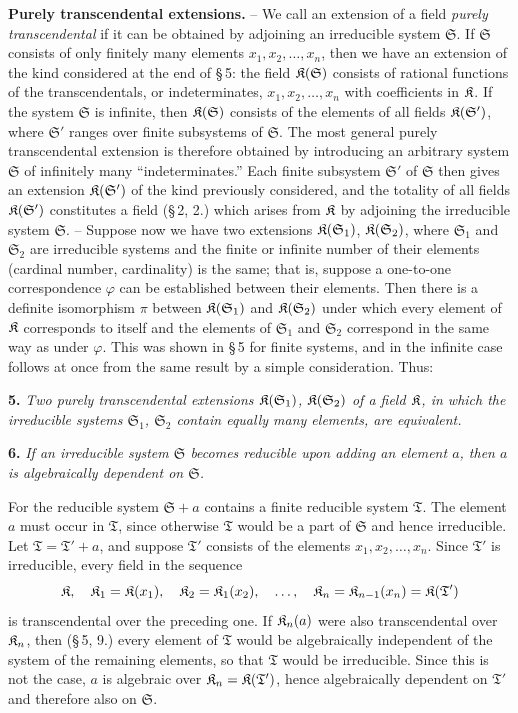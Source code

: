 \textbf{Purely transcendental extensions.} -- We call an extension of a field \emph{purely transcendental} if it can be obtained by adjoining an irreducible system $\mathfrak S$. If $\mathfrak S$ consists of only finitely many elements $x_1,x_2,\ldots,x_n$, then we have an extension of the kind considered at the end of \S\,5: the field $\mathfrak K(\mathfrak S)$ consists of rational functions of the transcendentals, or indeterminates, $x_1,x_2,\ldots,x_n$ with coefficients in $\mathfrak K$. If the system $\mathfrak S$ is infinite, then $\mathfrak K(\mathfrak S)$ consists of the elements of all fields $\mathfrak K(\mathfrak S')$, where $\mathfrak S'$ ranges over finite subsystems of $\mathfrak S$. The most general purely transcendental extension is therefore obtained by introducing an arbitrary system $\mathfrak S$ of infinitely many ``indeterminates.'' Each finite subsystem $\mathfrak S'$ of $\mathfrak S$ then gives an extension $\mathfrak K(\mathfrak S')$ of the kind previously considered, and the totality of all fields $\mathfrak K(\mathfrak S')$ constitutes a field (\S\,2, 2.) which arises from $\mathfrak K$ by adjoining the irreducible system $\mathfrak S$. -- Suppose now we have two extensions $\mathfrak K(\mathfrak S_1)$, $\mathfrak K(\mathfrak S_2)$, where $\mathfrak S_1$ and $\mathfrak S_2$ are irreducible systems and the finite or infinite number of their elements (cardinal number, cardinality) is the same; that is, suppose a one-to-one correspondence $\varphi$ can be established between their elements. Then there is a definite isomorphism $\pi$ between $\mathfrak K(\mathfrak S_1)$ and $\mathfrak K(\mathfrak S_2)$ under which every element of $\mathfrak K$ corresponds to itself and the elements of $\mathfrak S_1$ and $\mathfrak S_2$ correspond in the same way as under $\varphi$. This was shown in \S\,5 for finite systems, and in the infinite case follows at once from the same result by a simple consideration. Thus:

\textbf{5.} \emph{Two purely transcendental extensions $\mathfrak K(\mathfrak S_1)$, $\mathfrak K(\mathfrak S_2)$ of a field $\mathfrak K$, in which the irreducible systems $\mathfrak S_1$, $\mathfrak S_2$ contain equally many elements, are equivalent.}

\textbf{6.} \emph{If an irreducible system $\mathfrak S$ becomes reducible upon adding an element $a$, then $a$ is algebraically dependent on $\mathfrak S$.}

For the reducible system $\mathfrak S+a$ contains a finite reducible system $\mathfrak T$. The element $a$ must occur in $\mathfrak T$, since otherwise $\mathfrak T$ would be a part of $\mathfrak S$ and hence irreducible. Let $\mathfrak T=\mathfrak T'+a$, and suppose $\mathfrak T'$ consists of the elements $x_1,x_2,\ldots,x_n$. Since $\mathfrak T'$ is irreducible, every field in the sequence
\[
\mathfrak K,
\quad \mathfrak K_1=\mathfrak K(x_1),
\quad \mathfrak K_2=\mathfrak K_1(x_2),
\quad \ldots,
\quad \mathfrak K_n=\mathfrak K_{n-1}(x_n)=\mathfrak K(\mathfrak T')
\]
is transcendental over the preceding one. If $\mathfrak K_n(a)$ were also transcendental over $\mathfrak K_n$, then (\S\,5, 9.) every element of $\mathfrak T$ would be algebraically independent of the system of the remaining elements, so that $\mathfrak T$ would be irreducible. Since this is not the case, $a$ is algebraic over $\mathfrak K_n=\mathfrak K(\mathfrak T')$, hence algebraically dependent on $\mathfrak T'$ and therefore also on $\mathfrak S$.

